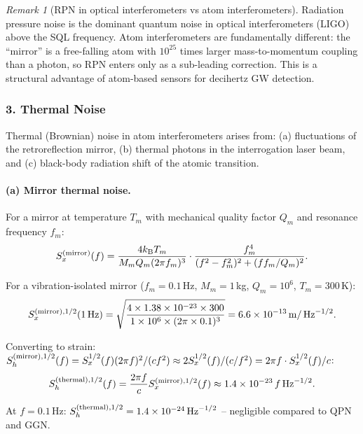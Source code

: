 \documentclass[11pt]{article}
\theoremstyle{definition}
\theoremstyle{remark}
\newtheorem{remark}[theorem]{Remark}
\newcommand{\kB}{k_{\mathrm{B}}}
\newcommand{\sqrtHz}{\,\mathrm{Hz}^{-1/2}}
\newcommand{\ee}[1]{\times10^{#1}}
\begin{document}
\begin{remark}[RPN in optical interferometers vs atom interferometers]
Radiation pressure noise is the dominant quantum noise in optical
interferometers (LIGO) above the SQL frequency.  Atom interferometers
are fundamentally different: the ``mirror'' is a free-falling atom with
$10^{25}$ times larger mass-to-momentum coupling than a photon, so
RPN enters only as a sub-leading correction.  This is a structural
advantage of atom-based sensors for decihertz GW detection.
\end{remark}

\subsubsection{3. Thermal Noise}

Thermal (Brownian) noise in atom interferometers arises from:
(a) fluctuations of the retroreflection mirror, (b) thermal photons
in the interrogation laser beam, and (c) black-body radiation shift
of the atomic transition.

\paragraph{(a) Mirror thermal noise.}
For a mirror at temperature $T_m$ with mechanical quality factor $Q_m$
and resonance frequency $f_m$:
\begin{equation}
S_x^{(\rm mirror)}(f) = \frac{4 \kB T_m}{M_m Q_m (2\pi f_m)^3}
\cdot \frac{f_m^4}{(f^2-f_m^2)^2 + (f f_m/Q_m)^2}.
\label{eq:mirror-thermal}
\end{equation}

For a vibration-isolated mirror ($f_m = 0.1$\,Hz, $M_m = 1$\,kg,
$Q_m = 10^6$, $T_m = 300$\,K):
\begin{equation}
S_x^{(\rm mirror),1/2}(1\,\rm Hz) = \sqrt{\frac{4 \times 1.38\ee{-23} \times 300}
{1 \times 10^6 \times (2\pi \times 0.1)^3}} = 6.6\ee{-13}\,\mathrm{m}/\sqrtHz.
\end{equation}

Converting to strain: $S_h^{(\rm mirror),1/2}(f) = S_x^{1/2}(f) (2\pi f)^2 / (c f^2)
\approx 2 S_x^{1/2}(f)/(c/f^2) = 2\pi f \cdot S_x^{1/2}(f)/c$:
\begin{equation}
S_h^{(\rm thermal),1/2}(f) = \frac{2\pi f}{c} S_x^{(\rm mirror),1/2}(f)
\approx 1.4\ee{-23}\,f\sqrtHz.
\end{equation}

At $f = 0.1$\,Hz: $S_h^{(\rm thermal),1/2} = 1.4\ee{-24}\sqrtHz$ -- negligible
compared to QPN and GGN.
\end{document}
